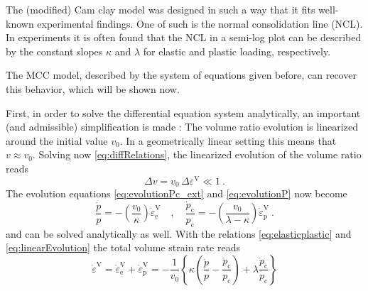 \documentclass[paper=a4, twoside, pagesize]{scrartcl}
\renewcommand{\c}{\text{c}}
\newcommand{\e}{\text{e}}
\newcommand{\p}{\text{p}}
\newcommand{\minus}{-}
\begin{document}

The (modified) Cam clay model was designed in such a way that it fits well-known experimental findings. One of such is the normal consolidation line (NCL). In experiments it is often found that the NCL in a semi-log plot can be described by the constant slopes $\kappa$ and $\lambda$ for elastic and plastic loading, respectively.

The MCC model, described by the system of equations given before, can recover this behavior, which will be shown now.
\par
First, in order to solve the differential equation system analytically, an important (and admissible) simplification is made \cite{Peric2006}:
The volume ratio evolution is linearized around the initial value $v_0$. In a geometrically linear setting this means that $v\approx v_0$. Solving now \eqref{eq:diffRelations}, the linearized evolution of the volume ratio reads
\begin{equation}\label{eq:vLinearization}
  \Delta v = v_0\,\Delta\varepsilon^\text{V} \ll 1 \ .
\end{equation}
The evolution equations \eqref{eq:evolutionPc_ext} and \eqref{eq:evolutionP} now become 
\begin{equation}\label{eq:linearEvolution}
  \frac{\dot{p}}{p} = -\left(\frac{v_0}{\kappa}\right) \dot{\varepsilon}_\e^\text{V}
  \quad,\quad 
  \frac{\dot{p}_\c}{p_\c} = -\left(\frac{v_0}{\lambda - \kappa}\right)\dot{\varepsilon}_\p^\text{V}
  \ .
\end{equation}
and can be solved analytically as well. With the relations \eqref{eq:elasticplastic} and \eqref{eq:linearEvolution} the total volume strain rate reads
\begin{equation}
  \dot{\varepsilon}^\text{V} = \dot{\varepsilon}_\e^\text{V} + \dot{\varepsilon}_\p^\text{V} 
  = \minus\frac{1}{v_0}\left\{ \kappa\left(\frac{\dot{p}}{p}-\frac{\dot{p}_\c}{p_\c}\right) +\lambda\frac{\dot{p}_\c}{p_\c} \right\}
\end{equation}
\end{document}

